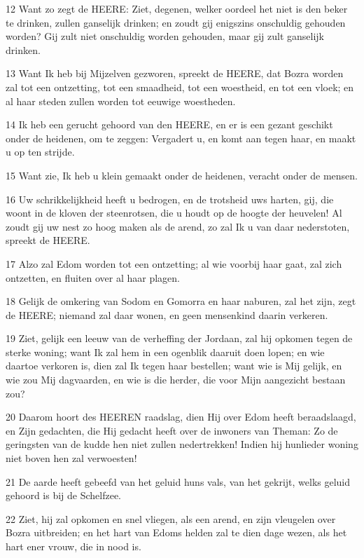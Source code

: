 \par 12 Want zo zegt de HEERE: Ziet, degenen, welker oordeel het niet is den beker te drinken, zullen ganselijk drinken; en zoudt gij enigszins onschuldig gehouden worden? Gij zult niet onschuldig worden gehouden, maar gij zult ganselijk drinken.
\par 13 Want Ik heb bij Mijzelven gezworen, spreekt de HEERE, dat Bozra worden zal tot een ontzetting, tot een smaadheid, tot een woestheid, en tot een vloek; en al haar steden zullen worden tot eeuwige woestheden.
\par 14 Ik heb een gerucht gehoord van den HEERE, en er is een gezant geschikt onder de heidenen, om te zeggen: Vergadert u, en komt aan tegen haar, en maakt u op ten strijde.
\par 15 Want zie, Ik heb u klein gemaakt onder de heidenen, veracht onder de mensen.
\par 16 Uw schrikkelijkheid heeft u bedrogen, en de trotsheid uws harten, gij, die woont in de kloven der steenrotsen, die u houdt op de hoogte der heuvelen! Al zoudt gij uw nest zo hoog maken als de arend, zo zal Ik u van daar nederstoten, spreekt de HEERE.
\par 17 Alzo zal Edom worden tot een ontzetting; al wie voorbij haar gaat, zal zich ontzetten, en fluiten over al haar plagen.
\par 18 Gelijk de omkering van Sodom en Gomorra en haar naburen, zal het zijn, zegt de HEERE; niemand zal daar wonen, en geen mensenkind daarin verkeren.
\par 19 Ziet, gelijk een leeuw van de verheffing der Jordaan, zal hij opkomen tegen de sterke woning; want Ik zal hem in een ogenblik daaruit doen lopen; en wie daartoe verkoren is, dien zal Ik tegen haar bestellen; want wie is Mij gelijk, en wie zou Mij dagvaarden, en wie is die herder, die voor Mijn aangezicht bestaan zou?
\par 20 Daarom hoort des HEEREN raadslag, dien Hij over Edom heeft beraadslaagd, en Zijn gedachten, die Hij gedacht heeft over de inwoners van Theman: Zo de geringsten van de kudde hen niet zullen nedertrekken! Indien hij hunlieder woning niet boven hen zal verwoesten!
\par 21 De aarde heeft gebeefd van het geluid huns vals, van het gekrijt, welks geluid gehoord is bij de Schelfzee.
\par 22 Ziet, hij zal opkomen en snel vliegen, als een arend, en zijn vleugelen over Bozra uitbreiden; en het hart van Edoms helden zal te dien dage wezen, als het hart ener vrouw, die in nood is.
